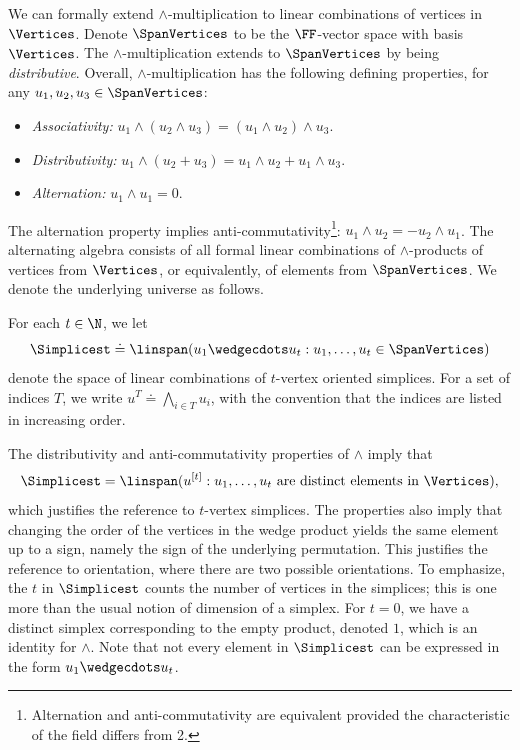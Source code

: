 We can formally extend $\wedge$-multiplication to linear combinations of 
vertices in $\Vertices$. Denote $\SpanVertices$ to be the $\FF$-vector space
with basis $\Vertices$. The $\wedge$-multiplication extends to $\SpanVertices$ by
being \emph{distributive}. Overall, $\wedge$-multiplication 
has the following defining properties, for any $u_1,u_2,u_3\in \SpanVertices$:
\begin{itemize}
    \item \emph{Associativity:} $u_1\wedge (u_2\wedge u_3) = (u_1\wedge u_2)\wedge u_3$.
    \item \emph{Distributivity:} $u_1\wedge (u_2+u_3) = u_1\wedge u_2 + u_1\wedge u_3$.
    \item \emph{Alternation:} $u_1 \wedge u_1 = 0$.
\end{itemize}
The alternation property implies anti-commutativity\footnote{Alternation and anti-commutativity are equivalent provided the characteristic of the field differs from 2.}: $u_1\wedge u_2=-u_2\wedge u_1$.
The alternating algebra consists of all formal linear combinations of \(\wedge\)-products of vertices from $\Vertices$, or equivalently, of elements from $\SpanVertices$. 
We denote the underlying universe as follows.
\begin{definition}
  \label{def.simplex-space}
  For each \(t\in\N\),
  we let
   \[
    \Simplicest
    \doteq
    \linspan (u_1 \wedgecdots u_t : u_1,\ldots,u_t \in \SpanVertices)
  \]
  denote the space of linear combinations of \(t\)-vertex oriented simplices. For a set of indices $T$, we write $u^T \doteq \bigwedge_{i\in T} u_i$, with the convention that the indices are listed in increasing order. 
\end{definition}
The distributivity and anti-commutativity properties of $\wedge$ imply that 
\[\Simplicest = \linspan (u^{[t]} : u_1,\dots,u_t \text{ are distinct elements in } \Vertices),\] 
which justifies the reference to $t$-vertex simplices. The properties also imply that changing the order of the vertices in the wedge product yields the same element up to a sign, namely the sign of the underlying permutation. This justifies the reference to orientation, where there are two possible orientations. To emphasize, the \(t\) in \(\Simplicest\) counts the number of vertices in the simplices; this is one more than the usual notion of dimension of a simplex. For $t=0$, we have a distinct simplex corresponding to the empty product, denoted \(1\), which is an identity for \(\wedge\). Note that not every element in $\Simplicest$ can be expressed in the form $u_1\wedgecdots u_t$. 

